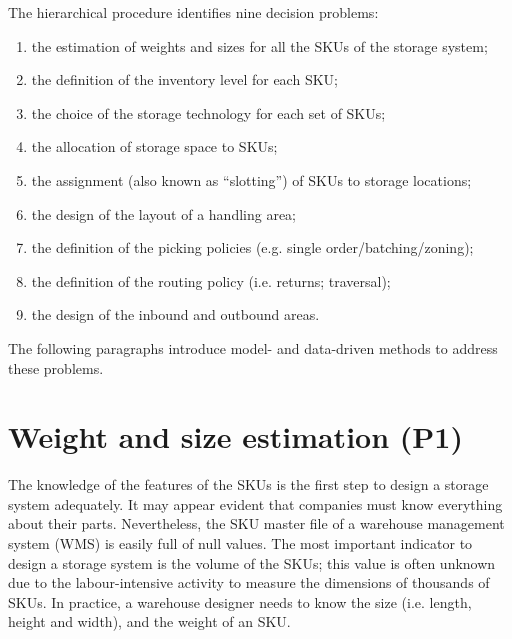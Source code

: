 The hierarchical procedure identifies nine decision problems:
\begin{enumerate}
    \item the estimation of weights and sizes for all the SKUs of the storage system;
    \item the definition of the inventory level for each SKU;
    \item the choice of the storage technology for each set of SKUs;
    \item the allocation of storage space to SKUs;
    \item the assignment (also known as “slotting”) of SKUs to storage locations;
    \item the design of the layout of a handling area;
    \item the definition of the picking policies (e.g. single order/batching/zoning);
    \item the definition of the routing policy (i.e. returns; traversal);
    \item the design of the inbound and outbound areas.

\end{enumerate}

The following paragraphs introduce model- and data-driven methods to address these problems.

\section{Weight and size estimation (P1)}
The knowledge of the features of the SKUs is the first step to design a storage system adequately. It may appear evident that companies must know everything about their parts. Nevertheless, the SKU master file of a warehouse management system (WMS) is easily full of null values. The most important indicator to design a storage system is the volume of the SKUs; this value is often unknown due to the labour-intensive activity to measure the dimensions of thousands of SKUs. In practice, a warehouse designer needs to know the size (i.e. length, height and width), and the weight of an SKU.

